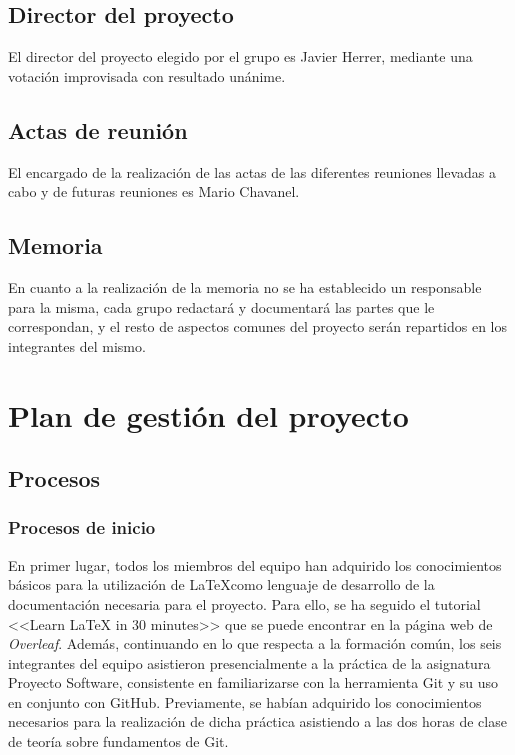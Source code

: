 \documentclass{article}
\begin{document}
\subsection{Director del proyecto}
El director del proyecto elegido por el grupo es Javier Herrer, mediante una votación improvisada con resultado unánime.

\subsection{Actas de reunión}
El encargado de la realización de las actas de las diferentes reuniones llevadas a cabo y de futuras reuniones es Mario Chavanel.

\subsection{Memoria}
En cuanto a la realización de la memoria no se ha establecido un responsable para la misma, cada grupo redactará y documentará las partes que le correspondan, y el resto de aspectos comunes del proyecto serán repartidos en los integrantes del mismo.

\section{Plan de gestión del proyecto}
\subsection{Procesos}
\subsubsection{Procesos de inicio}



En primer lugar, todos los miembros del equipo han adquirido los conocimientos básicos para la utilización de \LaTeX como lenguaje de desarrollo de la documentación necesaria para el proyecto. Para ello, se ha seguido el tutorial <<Learn LaTeX in 30 minutes>> que se puede encontrar en la página web de \textit{Overleaf}.
Además, continuando en lo que respecta a la formación común, los seis integrantes del equipo asistieron presencialmente a la práctica de la asignatura Proyecto Software, consistente en familiarizarse con la herramienta Git y su uso en conjunto con GitHub. Previamente, se habían adquirido los conocimientos necesarios para la realización
de dicha práctica asistiendo a las dos horas de clase de teoría sobre fundamentos de Git.
\end{document}
